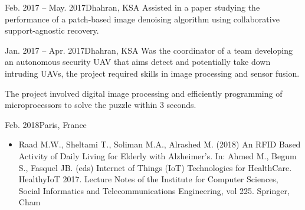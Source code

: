 \documentclass[10pt,a4paper]{altacv}
\begin{document}

{Feb. 2017 -- May. 2017}{Dhahran, KSA}
Assisted in a paper studying the performance of a patch-based image denoising algorithm using collaborative support-agnostic recovery.



{Jan. 2017 -- Apr. 2017}{Dhahran, KSA}
Was the coordinator of a team developing an autonomous security UAV that aims detect and potentially take down intruding UAVs, the project required skills in image processing and sensor fusion. 

\divider

The project involved digital image processing and efficiently programming of microprocessors to solve the puzzle within 3 seconds.  %

{Feb. 2018}{Paris, France}
  \begin{itemize}
  	\item {Raad M.W., Sheltami T., Soliman M.A., Alrashed M. (2018) An RFID Based Activity of Daily Living for Elderly with Alzheimer’s. In: Ahmed M., Begum S., Fasquel JB. (eds) Internet of Things (IoT) Technologies for HealthCare. HealthyIoT 2017. Lecture Notes of the Institute for Computer Sciences, Social Informatics and Telecommunications Engineering, vol 225. Springer, Cham}
  \end{itemize}
    
\end{document}
